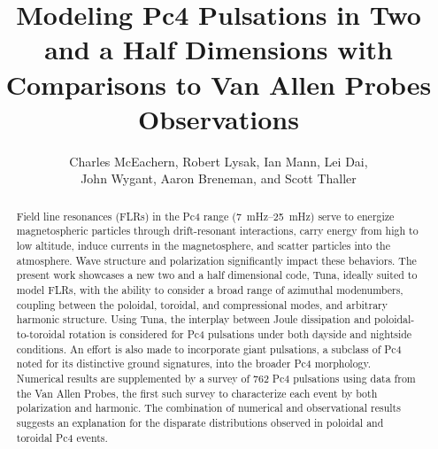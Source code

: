 \documentclass{article}
\begin{document}
\title{Modeling Pc4 Pulsations in Two and a Half Dimensions with Comparisons to Van Allen Probes Observations}

\author{
    Charles McEachern,
    Robert Lysak,
    Ian Mann,
    Lei Dai, \\
    John Wygant,
    Aaron Breneman, and
    Scott Thaller
}




\maketitle


\begin{abstract}

Field line resonances (FLRs) in the Pc4 range (\SIrange{7}{25}{\mHz}) serve to energize magnetospheric particles through drift-resonant interactions, carry energy from high to low altitude, induce currents in the magnetosphere, and scatter particles into the atmosphere. Wave structure and polarization significantly impact these behaviors. The present work showcases a new two and a half dimensional code, Tuna, ideally suited to model FLRs, with the ability to consider a broad range of azimuthal modenumbers, coupling between the poloidal, toroidal, and compressional modes, and arbitrary harmonic structure. Using Tuna, the interplay between Joule dissipation and poloidal-to-toroidal rotation is considered for Pc4 pulsations under both dayside and nightside conditions. An effort is also made to incorporate giant pulsations, a subclass of Pc4 noted for its distinctive ground signatures, into the broader Pc4 morphology. Numerical results are supplemented by a survey of 762 Pc4 pulsations using data from the Van Allen Probes, the first such survey to characterize each event by both polarization and harmonic. The combination of numerical and observational results suggests an explanation for the disparate distributions observed in poloidal and toroidal Pc4 events.

\end{abstract}

\end{document}
